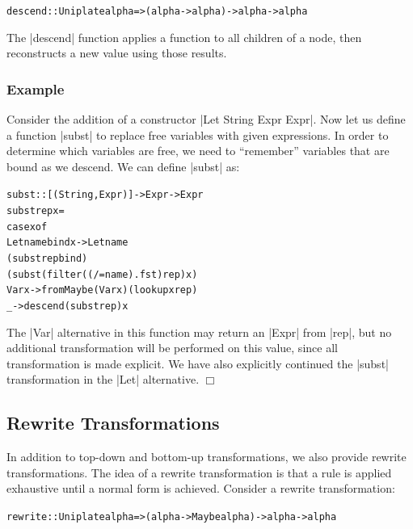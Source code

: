 \documentclass[preprint]{sigplanconf}
\newcounter{exmp}
\newcommand{\yesexample}{\subsubsection*{Example \arabic{exmp}}\refstepcounter{exmp}}
\newcommand{\noexample}{\hfill$\Box$}
\newenvironment{code}{\begin{alltt}\small}{\end{alltt}}
\newenvironment{example}{\yesexample}{\noexample}
\newcommand{\ignore}{}
\begin{document}
\begin{code}
descend :: Uniplate alpha => (alpha -> alpha) -> alpha -> alpha
\end{code}

The |descend| function applies a function to all children of a node, then reconstructs a new value using those results.

\begin{example}
Consider the addition of a constructor \ignore|Let String Expr Expr|. Now let us define a function |subst| to replace free variables with given expressions. In order to determine which variables are free, we need to ``remember'' variables that are bound as we descend. We can define |subst| as:

\begin{code}
subst :: [(String,Expr)] -> Expr -> Expr
subst rep x =
    case  x of
          Let name bind x -> Let name
              (subst rep bind)
              (subst (filter ((/= name) . fst) rep) x)
          Var x -> fromMaybe (Var x) (lookup x rep)
          _ -> descend (subst rep) x
\end{code}

The |Var| alternative in this function may return an |Expr| from |rep|, but no additional transformation will be performed on this value, since all transformation is made explicit. We have also explicitly continued the |subst| transformation in the |Let| alternative.
\end{example}

\subsection{Rewrite Transformations}

In addition to top-down and bottom-up transformations, we also provide rewrite transformations. The idea of a rewrite transformation is that a rule is applied exhaustive until a normal form is achieved. Consider a rewrite transformation:

\begin{code}
rewrite :: Uniplate alpha => (alpha -> Maybe alpha) -> alpha -> alpha
\end{code}
\end{document}

